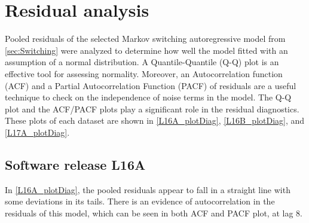 \section{Residual analysis\label{sec:Residual}}

Pooled residuals of the selected Markov switching autoregressive model
from \ref{sec:Switching} were analyzed to determine how well the
model fitted with an assumption of a normal distribution. A Quantile-Quantile
(Q-Q) plot is an effective tool for assessing normality. Moreover,
an Autocorrelation function (ACF) and a Partial Autocorrelation Function
(PACF) of residuals are a useful technique to check on the independence
of noise terms in the model. The Q-Q plot and the ACF/PACF plots play
a significant role in the residual diagnostics. These plots of each
dataset are shown in \ref{L16A_plotDiag}, \ref{L16B_plotDiag}, and
\ref{L17A_plotDiag}. 

\subsection{Software release L16A}

In \ref{L16A_plotDiag}, the pooled residuals appear to fall in a
straight line with some deviations in its tails. There is an evidence
of autocorrelation in the residuals of this model, which can be seen
in both ACF and PACF plot, at lag 8. %


